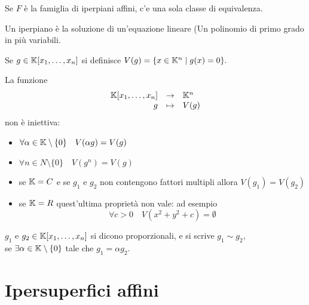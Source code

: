 \documentclass[a4paper,12pt]{article}
\newcommand{\Got}[1]{#1}
\newcommand{\got}[1]{{#1}}
\begin{document}
 \begin{ossI}
\Got{Se} $\got{F}$ \Got{è la famiglia di iperpiani affini, c'e una sola classe di equivalenza.}
\end{ossI}
 
 \begin{ossII}
 \Got{Un iperpiano è la soluzione di un'equazione lineare (Un polinomio di primo grado in più variabili.}
 \end{ossII}
 
  \vspace{0.5cm}
 
 \begin{notazione}
 \Got{Se} $\got{g\in \K[ x_1,\ldots,x_n]}$ \Got{si definisce} $\got{V(g)=\{x\in \K^n\;|\;g(x)=0\}.}$
 \end{notazione}
 
 \begin{remark}
 \Got{La funzione}
 \[
	\begin{array}{rcl}
		\got{\K[ x_1,\ldots,x_n]} & \to & \got{\K^n} \\
		\got{g} & \mapsto & \got{V(g)}
	\end{array}
 \]
 \Got{non è iniettiva:}
	\begin{itemize}
		\item $\got{\forall\alpha\in \K\setminus\{0\}\quad V(\alpha g)=V(g)}$
		\item $\got{\forall n\in N\setminus\{0\}\quad V(g^n)=V(g)}$
		\item \Got{se} $\got{\K=C}$ \Got{e se} $\got{g_1}$ \Got{e} $\got{g_2}$ \Got{non contengono fattori multipli allora} $\got{V(g_1)=V(g_2)}$
		\item \Got{se} $\got{\K=R}$ \Got{quest'ultima proprietà non vale: ad esempio}
			$$\got{\forall c>0\quad V(x^2+y^2+c)=\emptyset}$$
	\end{itemize}
 \end{remark}

 \begin{definition}
 \Got{}$\got{g_1}$ \Got{e} $\got{g_2\in \K[x_1,\ldots,x_n]}$ \Got{si dicono proporzionali, e si scrive}
 $\got{g_1\sim g_2,}$\\
 \Got{se} $\got{\exists\alpha\in \K\setminus\{0\}}$ \Got{tale che} $\got{g_1=\alpha g_2.}$
 \end{definition}

  \section{Ipersuperfici affini}
 
\end{document}
